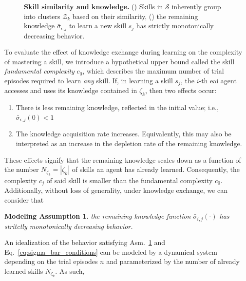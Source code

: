 \documentclass[12pt]{article}
\renewcommand{\emph}[1]{\textit{#1}}
\newtheorem{assumption}{Modeling Assumption}
\begin{document}
\begin{figure}[!t]
\begin{subfigure}[t]{7.5cm}
	\end{subfigure}
	\hspace*{\fill}
	\caption[] {\label{fig:experimental_results} \textbf{Skill similarity and knowledge.} () Skills in $\mathcal{S}$ inherently group into clusters $\mathcal{Z}_k$ based on their similarity, () the remaining knowledge $\bar{\sigma}_{i,j}$ to learn a new skill $s_{j}$ has strictly monotonically decreasing behavior.}	
\end{figure}

To evaluate the effect of knowledge exchange during learning on the complexity of mastering a skill, we introduce a hypothetical upper bound called the skill \textit{fundamental complexity} $c_0$, which describes the maximum number of trial episodes required to learn \emph{any} skill. If, in learning a skill $ s_{j} $, the $i$-th \ac{eai} agent accesses and uses its knowledge contained in $\mathcal{\zeta}_k$, then two effects occur:
\begin{enumerate}
	\item There is less remaining knowledge, reflected in the initial value; i.e., $\bar{\sigma}_{i,j}(0) < 1$
	\item The knowledge acquisition rate increases. Equivalently, this may also be interpreted as an increase in the depletion rate of the remaining knowledge.
\end{enumerate}
These effects signify that the remaining knowledge scales down as a function of the number $N_{\zeta_k}=|\mathcal{\zeta}_k|$ of skills an agent has already learned. Consequently, the complexity $c_{j}$ of said skill is smaller than the fundamental complexity $c_0$. Additionally, without loss of generality, under knowledge exchange, we can consider that
\begin{tcolorbox}
	\begin{assumption}\label{assumption:exponential_decrease} the remaining knowledge function $\bar{\sigma}_{i,j}(\cdot)$ has stritctly monotonically decreasing behavior.
	\end{assumption}
\end{tcolorbox} 
\noindent An idealization of the behavior satisfying Asm.~\ref{assumption:exponential_decrease} and Eq.~\eqref{eq:sigma_bar_conditions} can be modeled by a dynamical system depending on the trial episodes $n$ and parameterized by the number of already learned skills $N_{\zeta_k}$. As such,
\end{document}
